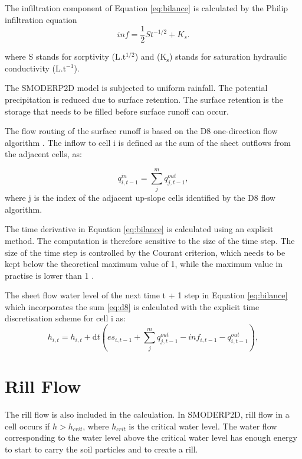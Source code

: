 The infiltration component of Equation \ref{eq:bilance} is calculated by the
Philip infiltration equation \citep{philip1957}
\begin{equation} 
inf = \frac{1}{2}St^{-1/2}+K_s.
\label{eq:infiltration}
\end{equation} 

where S stands for sorptivity ($\mathrm{L.t^{1/2}}$) and ($\mathrm{K_s}$)
stands for saturation hydraulic conductivity ($\mathrm{L.t^{-1}}$).

The SMODERP2D model is subjected to uniform rainfall. The potential
precipitation is reduced due to surface retention. The surface retention is the
storage that needs to be filled before surface runoff can occur. 

The flow routing of the surface runoff is based on the D8 one-direction flow
algorithm \cite{o1984extraction}. The inflow to cell i is defined as the sum of the sheet
outflows from the adjacent cells, as:

\begin{equation} 
q^{in}_{i,t-1} = \sum_j^m q^{out}_{j,t-1}, 
\label{eq:d8}
\end{equation} 
where j is the index of the adjacent up-slope cells identified by the D8 flow
algorithm.

The time derivative in Equation \ref{eq:bilance} is calculated using an
explicit method. The computation is therefore sensitive to the size of the time
step. The size of the time step is controlled by the Courant criterion, which
needs to be kept below the theoretical maximum value of 1, while the maximum
value in practise is lower than 1 
\cite{zhang1989modeling, esteves2000overland}.


The sheet flow water level of the next time t + 1 step in Equation
\ref{eq:bilance} which incorporates the sum \ref{eq:d8} is calculated with the
explicit time discretisation scheme for cell i as:
\begin{equation} 
h_{i,t} =h_{i,t} + \mathrm{d}t (es_{i,t-1} + \sum_j^m q^{out}_{j,t-1}-
inf_{i,t-1} - q^{out}_{i,t-1}),
\label{eq:bilance}
\end{equation}

\section{Rill Flow}

The rill flow is also included in the calculation. In SMODERP2D, rill flow in a
cell occurs if $h>h_{crit}$, where $h_{crit}$ is the critical water level. The
water flow corresponding to the water level above the critical water level has
enough energy to start to carry the soil particles and to create a rill.

